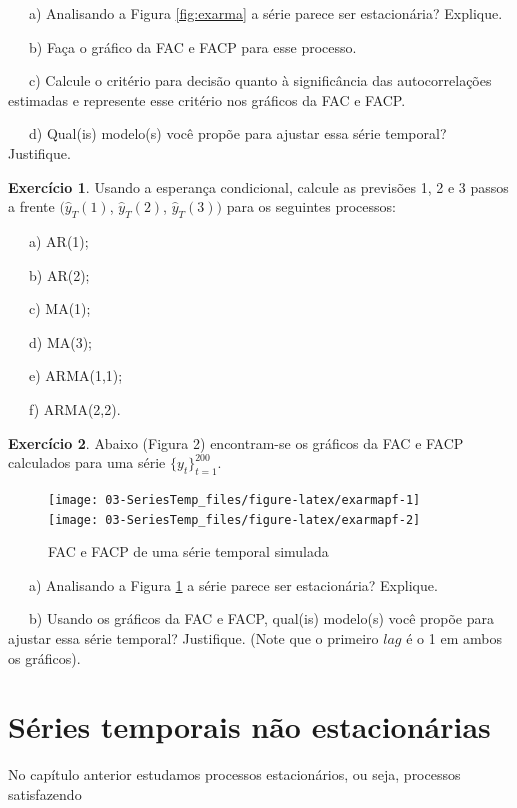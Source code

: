 \documentclass[
]{book}
\theoremstyle{definition}
\theoremstyle{definition}
\theoremstyle{definition}
\newtheorem{exercise}{Exercício}[chapter]
\theoremstyle{remark}
\begin{document}
~~~a) Analisando a Figura \ref{fig:exarma} a série parece ser estacionária? Explique.

~~~b) Faça o gráfico da FAC e FACP para esse processo.

~~~c) Calcule o critério para decisão quanto à significância das autocorrelações estimadas e represente esse critério nos gráficos da FAC e FACP.

~~~d) Qual(is) modelo(s) você propõe para ajustar essa série temporal? Justifique.

\begin{exercise}
\protect\hypertarget{exr:exprev}{}{\label{exr:exprev} }Usando a esperança condicional, calcule as previsões 1, 2 e 3 passos a frente \((\widehat{y}_T(1)\), \(\widehat{y}_T(2)\), \(\widehat{y}_T(3))\) para os seguintes processos:

~~~a) AR(1);

~~~b) AR(2);

~~~c) MA(1);

~~~d) MA(3);

~~~e) ARMA(1,1);

~~~f) ARMA(2,2).
\end{exercise}

\begin{exercise}
\protect\hypertarget{exr:exprev200}{}{\label{exr:exprev200} }Abaixo (Figura 2) encontram-se os gráficos da FAC e FACP calculados para uma série
\(\{y_t\}^{200}_{t=1}\).
\end{exercise}

\begin{figure}
\texttt{[image: 03-SeriesTemp\_files/figure-latex/exarmapf-1]} \texttt{[image: 03-SeriesTemp\_files/figure-latex/exarmapf-2]} \caption{FAC e FACP de uma série temporal simulada}\label{fig:exarmapf}
\end{figure}

~~~a) Analisando a Figura \ref{fig:exarmapf} a série parece ser estacionária? Explique.

~~~b) Usando os gráficos da FAC e FACP, qual(is) modelo(s) você propõe para ajustar essa série temporal? Justifique. (Note que o primeiro \(lag\) é o 1 em ambos os gráficos).

\hypertarget{stnoest}{%
\chapter{Séries temporais não estacionárias}\label{stnoest}}

No capítulo anterior estudamos processos estacionários, ou seja, processos satisfazendo
\end{document}
